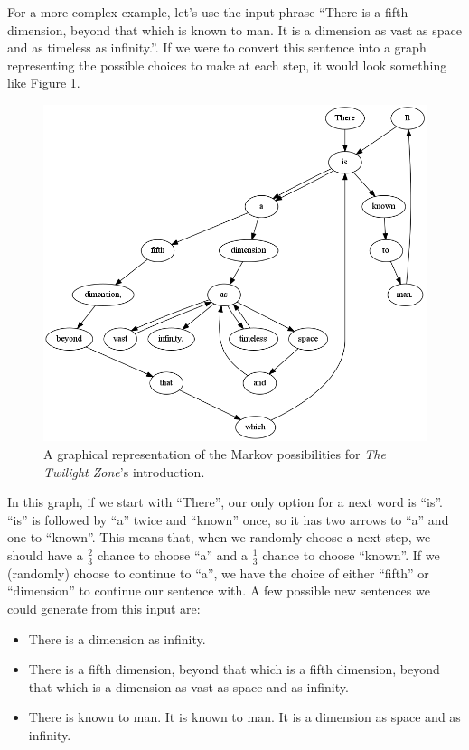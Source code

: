 \documentclass[11pt]{cselabheader}
\begin{document}
For a more complex example, let's use the input phrase ``There is a fifth
dimension, beyond that which is known to man. It is a dimension as vast as space
and as timeless as infinity.''. If we were to convert this sentence into a graph
representing the possible choices to make at each step, it would look something
like Figure \ref{twilight}.

\begin{figure}[h]
  \centering
  \includegraphics[width=\linewidth]{lab10/twilight_zone}
  \caption{A graphical representation of the Markov possibilities for \emph{The
    Twilight Zone}'s introduction.}
  \label{twilight}
\end{figure}

In this graph, if we start with ``There'', our only option for a next word is
``is''. ``is'' is followed by ``a'' twice and ``known'' once, so it has two
arrows to ``a'' and one to ``known''. This means that, when we randomly choose a
next step, we should have a $\frac{2}{3}$ chance to choose ``a'' and a
$\frac{1}{3}$ chance to choose ``known''. If we (randomly) choose to continue to
``a'', we have the choice of either ``fifth'' or ``dimension'' to continue our
sentence with. A few possible new sentences we could generate from this input
are:
\begin{itemize}
  \item There is a dimension as infinity.
  \item There is a fifth dimension, beyond that which is a fifth dimension,
    beyond that which is a dimension as vast as space and as infinity.
  \item There is known to man. It is known to man. It is a dimension as space
    and as infinity.
\end{itemize}
\end{document}
